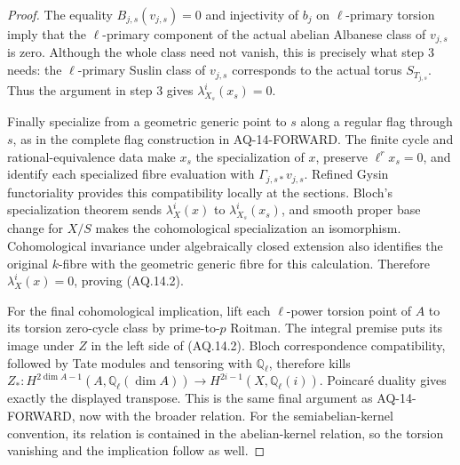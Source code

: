 \begin{proof}
The equality $B_{j,s}(v_{j,s})=0$ and injectivity of
$b_j$ on $\ell$-primary torsion imply that the
$\ell$-primary component of the actual abelian Albanese
class of $v_{j,s}$ is zero. Although the whole class
need not vanish, this is precisely what step 3 needs:
the $\ell$-primary Suslin class of $v_{j,s}$ corresponds
to the actual torus $S_{T_{j,s}}$. Thus the argument
in step 3 gives $\lambda_{X_s}^i(x_s)=0$.

Finally specialize from a geometric generic point to
$s$ along a regular flag through $s$, as in the complete
flag construction in AQ-14-FORWARD. The finite cycle
and rational-equivalence data make $x_s$ the
specialization of $x$, preserve $\ell^r x_s=0$, and
identify each specialized fibre evaluation with
$\Gamma_{j,s*}v_{j,s}$. Refined Gysin functoriality
provides this compatibility locally at the sections.
Bloch's specialization theorem sends
$\lambda_X^i(x)$ to $\lambda_{X_s}^i(x_s)$, and smooth
proper base change for $X/S$ makes the cohomological
specialization an isomorphism. Cohomological invariance
under algebraically closed extension also identifies
the original $k$-fibre with the geometric generic
fibre for this calculation. Therefore
$\lambda_X^i(x)=0$, proving (AQ.14.2).

For the final cohomological implication, lift each
$\ell$-power torsion point of $A$ to its torsion
zero-cycle class by prime-to-$p$ Roitman. The integral
premise puts its image under $Z$ in the left side of
(AQ.14.2). Bloch correspondence compatibility, followed
by Tate modules and tensoring with $\mathbb Q_\ell$,
therefore kills
$Z_*:H^{2\dim A-1}(A,\mathbb Q_\ell(\dim A))
\to H^{2i-1}(X,\mathbb Q_\ell(i))$.
Poincar\'e duality gives exactly the displayed transpose.
This is the same final argument as AQ-14-FORWARD, now
with the broader relation. For the semiabelian-kernel
convention, its relation is contained in the
abelian-kernel relation, so the torsion vanishing and
the implication follow as well.
\end{proof}
